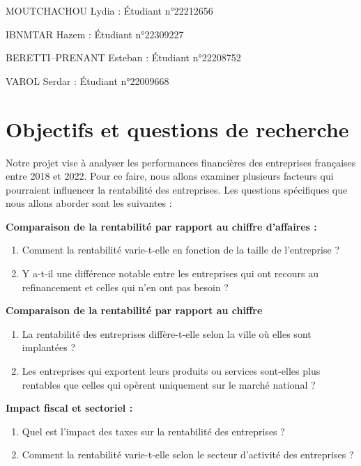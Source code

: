 \documentclass[mstat,12pt]{unswthesis}
\begin{document}
MOUTCHACHOU Lydia : Étudiant n°22212656

IBNMTAR Hazem : Étudiant n°22309227

BERETTI--PRENANT Esteban : Étudiant n°22208752

VAROL Serdar : Étudiant n°22009668

\bigskip

\section{Objectifs et questions de
recherche}\label{objectifs-et-questions-de-recherche}

Notre projet vise à analyser les performances financières des
entreprises françaises entre 2018 et 2022. Pour ce faire, nous allons
examiner plusieurs facteurs qui pourraient influencer la rentabilité des
entreprises. Les questions spécifiques que nous allons aborder sont les
suivantes :

\medskip

\textbf{Comparaison de la rentabilité par rapport au chiffre d'affaires
:}

\begin{enumerate}
\def\labelenumi{\alph{enumi}.}
\item
  Comment la rentabilité varie-t-elle en fonction de la taille de
  l'entreprise ?
\item
  Y a-t-il une différence notable entre les entreprises qui ont recours
  au refinancement et celles qui n'en ont pas besoin ?
\end{enumerate}

\textbf{Comparaison de la rentabilité par rapport au chiffre}

\begin{enumerate}
\def\labelenumi{\alph{enumi}.}
\item
  La rentabilité des entreprises diffère-t-elle selon la ville où elles
  sont implantées ?
\item
  Les entreprises qui exportent leurs produits ou services sont-elles
  plus rentables que celles qui opèrent uniquement sur le marché
  national ?
\end{enumerate}

\textbf{Impact fiscal et sectoriel :}

\begin{enumerate}
\def\labelenumi{\alph{enumi}.}
\item
  Quel est l'impact des taxes sur la rentabilité des entreprises ?
\item
  Comment la rentabilité varie-t-elle selon le secteur d'activité des
  entreprises ?
\end{enumerate}
\end{document}
